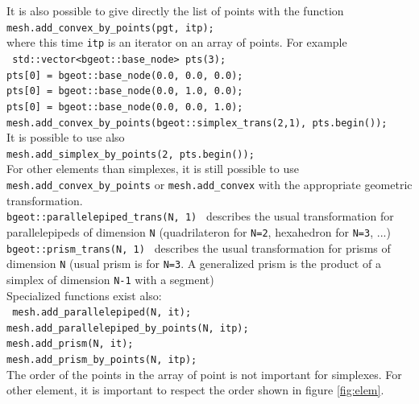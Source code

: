 \documentclass[11pt,a4paper]{article}
\begin{document}
It is also possible to give directly the list of points with the function\\[0.5cm]
{\tt mesh.add\_convex\_by\_points(pgt, itp); }\\[0.5cm]
where this time {\tt itp} is an iterator on an array of points. For example\\[0.5cm]
{\tt
  std::vector<bgeot::base\_node> pts(3); \\
  pts[0] = bgeot::base\_node(0.0, 0.0, 0.0); \\
  pts[0] = bgeot::base\_node(0.0, 1.0, 0.0); \\
  pts[0] = bgeot::base\_node(0.0, 0.0, 1.0); \\
  mesh.add\_convex\_by\_points(bgeot::simplex\_trans(2,1), pts.begin());
}\\[0.5cm]
It is possible to use also \\[0.5cm]
{\tt mesh.add\_simplex\_by\_points(2, pts.begin()); } \\[0.5cm]

For other elements than simplexes, it is still possible to use {\tt mesh.add\_convex\_by\_points} or {\tt mesh.add\_convex} with the appropriate geometric transformation. \\[0.5cm]
{\tt bgeot::parallelepiped\_trans(N, 1) }
describes the usual transformation for parallelepipeds of dimension {\tt N} (quadrilateron for {\tt N=2}, hexahedron for {\tt N=3}, ...) \\[0.5cm]
{\tt bgeot::prism\_trans(N, 1) } 
describes the usual transformation for prisms of dimension {\tt N} (usual prism is for {\tt N=3}. A generalized prism is the product of a simplex of dimension {\tt N-1} with a segment) \\[0.5cm]
Specialized functions exist also: \\[0.5cm]
{\tt 
  mesh.add\_parallelepiped(N, it); \\
  mesh.add\_parallelepiped\_by\_points(N, itp); \\
  mesh.add\_prism(N, it); \\
  mesh.add\_prism\_by\_points(N, itp);
} \\[0.5cm]

The order of the points in the array of point is not important for simplexes. For other element, it is important to respect the order shown in figure \ref{fig:elem}.
\end{document}

